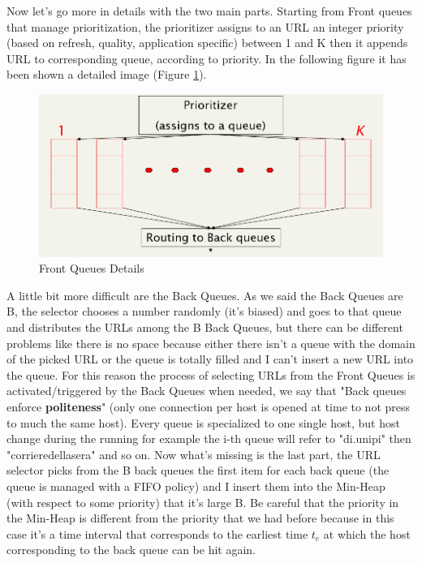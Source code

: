 Now let's go more in details with the two main parts.\newline
Starting from Front queues that manage prioritization, the prioritizer assigns to an URL an integer priority (based on refresh, quality, application specific) between 1 and K then it appends URL to corresponding queue, according to priority. In the following figure it has been shown a detailed image (Figure \ref{fig:frontqueues}).\newline
\begin{figure}
    \centering
    \includegraphics[width=0.75\linewidth]{images/frontqueue.png}
    \caption{Front Queues Details}
    \label{fig:frontqueues}
\end{figure}
A little bit more difficult are the Back Queues. As we said the Back Queues are B, the selector chooses a number randomly (it's biased) and goes to that queue and distributes the URLs among the B Back Queues, but there can be different problems like there is no space because either there isn't a queue with the domain of the picked URL or the queue is totally filled and I can't insert a new URL into the queue. For this reason the process of selecting URLs from the Front Queues is activated/triggered by the Back Queues when needed, we say that "Back queues enforce \textbf{politeness}" (only one connection per host is opened at time to not press to much the same host). Every queue is specialized to one single host, but host change during the running for example the i-th queue will refer to "di.unipi" then "corrieredellasera" and so on.\newline
Now what's missing is the last part, the URL selector picks from the B back queues the first item for each back queue (the queue is managed with a FIFO policy) and I insert them into the Min-Heap (with respect to some priority) that it's large B. Be careful that the priority in the Min-Heap is different from the priority that we had before because in this case it's a time interval that corresponds to the earliest time $t_e$ at which the host corresponding to the back queue can be hit again.\newline 
